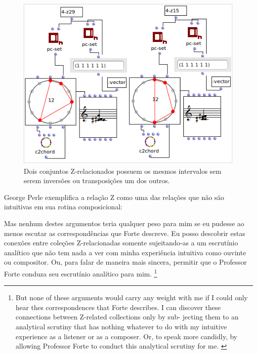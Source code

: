\documentclass[
	12pt,				%
	openright,			%
	twoside,			%
	a4paper,			%
	english,			%
	french,				%
	spanish,			%
	brazil				%
	]{abntex2}
\begin{document}
\begin{figure}[!h]
	\caption{\label{fig_grafico}Dois conjuntos Z-relacionados possuem os mesmos intervalos sem serem inversões ou transposições um dos outros. }
	\begin{center}
	    \includegraphics[scale=0.7]{OM_settheory/Z_related.png}
	\end{center}
\end{figure}


George Perle exemplifica a relação Z como uma das relações que não são intuitivas em sua rotina composicional:

\begin{citacao}
Mas nenhum destes argumentos teria qualquer peso para mim se eu pudesse ao menos escutar as correspondências que Forte descreve. Eu posso descobrir estas conexões entre coleções Z-relacionadas somente sujeitando-as a um escrutínio analítico que não tem nada a ver com minha experiência intuitiva como ouvinte ou compositor. Ou, para falar de maneira mais sincera, permitir que o Professor Forte conduza seu escrutínio analítico para mim.
\cite[p.168]{perle1990pitch}\footnote{
But none of these arguments would carry any weight with me if
I could only hear thes correspondences that Forte describes. I can
discover these connections between Z-related collections only by sub-
jecting them to an analytical scrutiny that has nothing whatever to do
with my intuitive experience as a listener or as a composer. Or, to
speak more candidly, by allowing Professor Forte to conduct this
analytical scrutiny for me. 
\cite[p.168]{perle1990pitch}}
\end{citacao}
\end{document}
